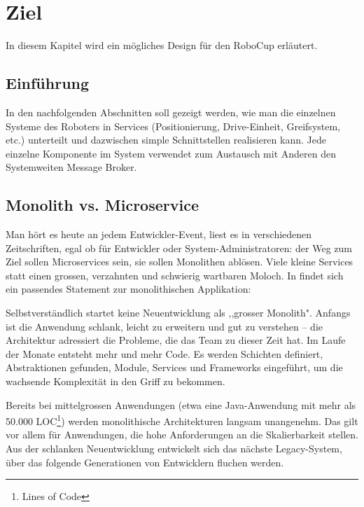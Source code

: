 \chapter{Ziel}
\label{chap:software-design}
In diesem Kapitel wird ein mögliches Design für den RoboCup erläutert.
\section{Einführung}
In den nachfolgenden Abschnitten soll gezeigt werden, wie man die einzelnen Systeme des Roboters in Services (Positionierung, Drive-Einheit, Greifsystem, etc.) unterteilt und dazwischen simple Schnittstellen realisieren kann.
Jede einzelne Komponente im System verwendet zum Austausch mit Anderen den Systemweiten Message Broker.

\section{Monolith vs. Microservice}
Man hört es heute an jedem Entwickler-Event, liest es in verschiedenen Zeitschriften, egal ob für Entwickler oder System-Administratoren: der Weg zum Ziel sollen Microservices sein, sie sollen Monolithen ablösen. Viele kleine Services statt einen grossen, verzahnten und schwierig wartbaren Moloch.
In \cite{informatik-aktuell-microservices} findet sich ein passendes Statement zur monolithischen Applikation:
\begin{formal}
	Selbstverständlich startet keine Neuentwicklung als ,,grosser Monolith". Anfangs ist die Anwendung schlank, leicht zu erweitern und gut zu verstehen – die Architektur adressiert die Probleme, die das Team zu dieser Zeit hat. Im Laufe der Monate entsteht mehr und mehr Code. Es werden Schichten definiert, Abstraktionen gefunden, Module, Services und Frameworks eingeführt, um die wachsende Komplexität in den Griff zu bekommen.
	
	Bereits bei mittelgrossen Anwendungen (etwa eine Java-Anwendung mit mehr als 50.000 LOC\footnote{Lines of Code}) werden monolithische Architekturen langsam unangenehm. Das gilt vor allem für Anwendungen, die hohe Anforderungen an die Skalierbarkeit stellen. Aus der schlanken Neuentwicklung entwickelt sich das nächste Legacy-System, über das folgende Generationen von Entwicklern fluchen werden.
\end{formal}
